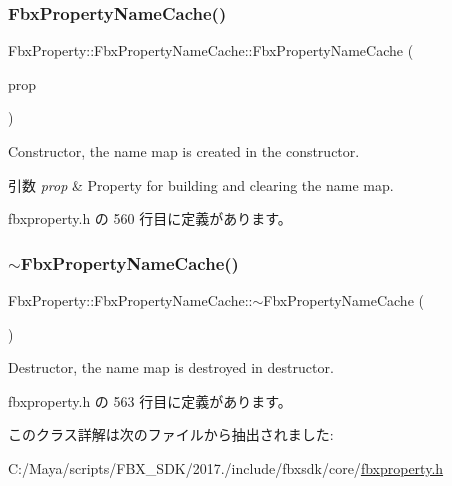 \subsubsection{\texorpdfstring{Fbx\+Property\+Name\+Cache()}{FbxPropertyNameCache()}}
{\footnotesize\ttfamily Fbx\+Property\+::\+Fbx\+Property\+Name\+Cache\+::\+Fbx\+Property\+Name\+Cache (\begin{DoxyParamCaption}\item[{const \hyperlink{class_fbx_property}{Fbx\+Property} \&}]{prop }\end{DoxyParamCaption})\hspace{0.3cm}{\ttfamily [inline]}}

Constructor, the name map is created in the constructor. 
\begin{DoxyParams}{引数}
{\em prop} & Property for building and clearing the name map. \\
\hline
\end{DoxyParams}


 fbxproperty.\+h の 560 行目に定義があります。

\mbox{\label{class_fbx_property_1_1_fbx_property_name_cache_a4750d4813c1a70064a44718946668f25}} 
\subsubsection{\texorpdfstring{$\sim$\+Fbx\+Property\+Name\+Cache()}{~FbxPropertyNameCache()}}
{\footnotesize\ttfamily Fbx\+Property\+::\+Fbx\+Property\+Name\+Cache\+::$\sim$\+Fbx\+Property\+Name\+Cache (\begin{DoxyParamCaption}{ }\end{DoxyParamCaption})\hspace{0.3cm}{\ttfamily [inline]}}



Destructor, the name map is destroyed in destructor. 



 fbxproperty.\+h の 563 行目に定義があります。



このクラス詳解は次のファイルから抽出されました\+:\begin{DoxyCompactItemize}
\item 
C\+:/\+Maya/scripts/\+F\+B\+X\+\_\+\+S\+D\+K/2017./include/fbxsdk/core/\hyperlink{fbxproperty_8h}{fbxproperty.\+h}\end{DoxyCompactItemize}
